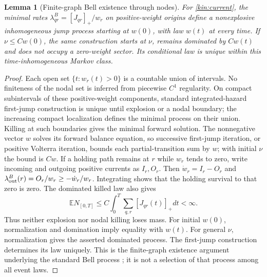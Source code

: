 \documentclass[11pt,oneside,openany]{book}
\newtheorem{lemma}[theorem]{Lemma}
\theoremstyle{definition}
\theoremstyle{remark}\newtheorem{remark}[theorem]{Remark}
\begin{document}
\begin{lemma}[Finite-graph Bell existence through nodes]\label{kin:existence}
For \eqref{kin:current}, the minimal rates
$\lambda^B_{qr}=[J_{qr}]_+/w_r$ on positive-weight origins define a
nonexplosive inhomogeneous jump process starting at $w(0)$, with law
$w(t)$ at every time. If $\nu\le Cw(0)$, the same construction starts at
$\nu$, remains dominated by $Cw(t)$ and does not occupy a zero-weight
sector. Its conditional law is unique within this time-inhomogeneous
Markov class.
\end{lemma}
\begin{proof}
Each open set $\{t:w_r(t)>0\}$ is a countable union of intervals.
No finiteness of the nodal set is inferred from piecewise $C^1$ regularity.
On compact subintervals of these positive-weight components, standard
integrated-hazard first-jump construction is unique until explosion or a
nodal boundary; the increasing compact localization defines the minimal
process on their union. Killing at
such boundaries gives the minimal forward solution. The nonnegative
vector $w$ solves its forward balance equation, so successive first-jump
iteration, or positive Volterra iteration, bounds each partial-transition
sum by $w$; with initial $\nu$ the bound is $Cw$.
If a holding path remains at $r$ while $w_r$ tends to zero, write incoming
and outgoing positive currents as $I_r,O_r$. Then
$\dot w_r=I_r-O_r$ and
$\lambda^B_{\rm out}(r)=O_r/w_r\ge-\dot w_r/w_r$.
Integrating shows that the holding survival to that zero is zero.
The dominated killed law also gives
\[
 \mathbb E N_{[0,T]}\le
 C\int_0^T\sum_{q,r}[J_{qr}(t)]_+dt<\infty.
\]
Thus neither explosion nor nodal killing loses mass. For initial $w(0)$,
normalization and domination imply equality with $w(t)$. For general
$\nu$, normalization gives the asserted dominated process. The
first-jump construction determines its law uniquely. This is the
finite-graph existence argument underlying the standard Bell process
\cite{BellQFT}; it is not a selection of that process among all event laws.
\end{proof}
\end{document}
